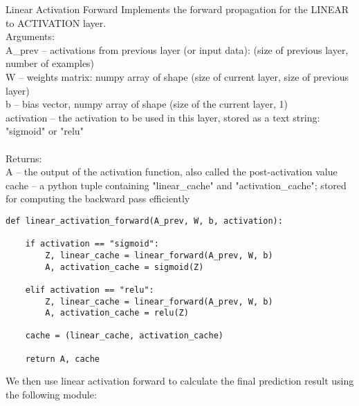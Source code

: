 \documentclass[a4paper]{article}
\begin{document}
\begin{alg}{Linear Activation Forward}{} Implements the forward propagation for the LINEAR to ACTIVATION layer. \\
Arguments: \\
A\_prev -- activations from previous layer (or input data): (size of previous layer, number of examples)\\
W -- weights matrix: numpy array of shape (size of current layer, size of previous layer)\\
b -- bias vector, numpy array of shape (size of the current layer, 1)\\
activation -- the activation to be used in this layer, stored as a text string: "sigmoid" or "relu"\\~\\
Returns:\\
A -- the output of the activation function, also called the post-activation value \\
cache -- a python tuple containing "linear\_cache" and "activation\_cache"; stored for computing the backward pass efficiently\\
\begin{verbatim}
def linear_activation_forward(A_prev, W, b, activation):

    if activation == "sigmoid":
        Z, linear_cache = linear_forward(A_prev, W, b)
        A, activation_cache = sigmoid(Z)
        
    elif activation == "relu":
        Z, linear_cache = linear_forward(A_prev, W, b)
        A, activation_cache = relu(Z) 
        
    cache = (linear_cache, activation_cache)

    return A, cache
\end{verbatim}
\end{alg}

We then use linear activation forward to calculate the final prediction result using the following module: 
\end{document}
